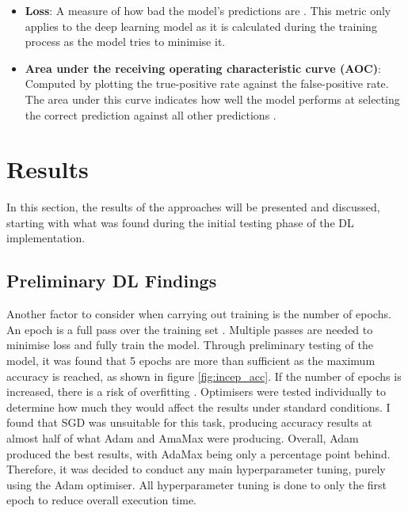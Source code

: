 \documentclass[12pt,a4paper]{report}
\begin{document}
\begin{itemize}
    \item \textbf{Loss}: A measure of how bad the model's predictions are \citep{googletrainloss}. 
    This metric only applies to the deep learning model as it is calculated during the training process as the model 
    tries to minimise it.
    \item \textbf{Area under the receiving operating characteristic curve (AOC)}: Computed by plotting the true-positive
    rate against the false-positive rate. The area under this curve indicates how well the model performs at selecting 
    the correct prediction against all other predictions \citep{googleroc}.
\end{itemize}

\section{Results}

In this section, the results of the approaches will be presented and discussed, starting with what was found during the
initial testing phase of the DL implementation.

\subsection{Preliminary DL Findings}

Another factor to consider when carrying out training is the number of epochs. An epoch is a full pass over the training
set \citep{epoch}. Multiple passes are needed to minimise loss and fully train the model. Through preliminary testing 
of the model, 
it was found that 5 epochs are more than sufficient as the maximum accuracy is reached, as shown in figure 
\ref{fig:incep_acc}. If
the number of epochs is increased, there is a risk of overfitting \citep{geeksforgeeks}. Optimisers were tested individually to 
determine how much they would affect the results under standard conditions. I found that SGD was unsuitable for this 
task, producing accuracy results at almost half of what Adam and AmaMax were producing. Overall, Adam produced the best 
results, with AdaMax being only a percentage point behind. Therefore, it was decided to conduct any main hyperparameter 
tuning, purely using the Adam optimiser. All hyperparameter tuning is done to only the first epoch to reduce overall 
execution time. 
\end{document}
